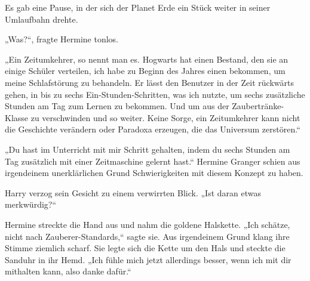 Es gab eine Pause, in der sich der Planet Erde ein Stück weiter in seiner Umlaufbahn drehte.

„Was?“, fragte Hermine tonlos.

„Ein Zeitumkehrer, so nennt man es. Hogwarts hat einen Bestand, den sie an einige Schüler verteilen, ich habe zu Beginn des Jahres einen bekommen, um meine Schlafstörung zu behandeln. Er lässt den Benutzer in der Zeit rückwärts gehen, in bis zu sechs Ein-Stunden-Schritten, was ich nutzte, um sechs zusätzliche Stunden am Tag zum Lernen zu bekommen. Und um aus der Zaubertränke-Klasse zu verschwinden und so weiter. Keine Sorge, ein Zeitumkehrer kann nicht die Geschichte verändern oder Paradoxa erzeugen, die das Universum zerstören.“

„Du hast im Unterricht mit mir Schritt gehalten, indem du sechs Stunden am Tag zusätzlich mit einer Zeitmaschine gelernt hast.“
Hermine Granger schien aus irgendeinem unerklärlichen Grund Schwierigkeiten mit diesem Konzept zu haben.

Harry verzog sein Gesicht zu einem verwirrten Blick.
„Ist daran etwas merkwürdig?“

Hermine streckte die Hand aus und nahm die goldene Halskette.
„Ich schätze, nicht nach Zauberer-Standards,“ sagte sie.
Aus irgendeinem Grund klang ihre Stimme ziemlich scharf.
Sie legte sich die Kette um den Hals und steckte die Sanduhr in ihr Hemd. „Ich fühle mich jetzt allerdings besser, wenn ich mit dir mithalten kann, also danke dafür.“

